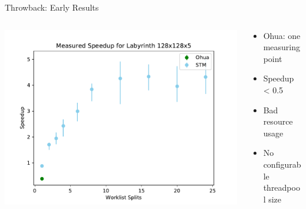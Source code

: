 \documentclass[aspectratio=169, usenames, dvipsnames]{beamer}
\begin{document}
\begin{frame}{Throwback: Early Results}
  \begin{columns}
    \begin{column}{0.55\textwidth}
      \centering
      \includegraphics[width=\textwidth,height=.7\textheight,keepaspectratio]{img/2019-04-18-128x128x5}
    \end{column}
    \begin{column}{0.45\textwidth}
      \begin{itemize}
        \item Ohua: one measuring point
        \item Speedup < 0.5
        \item<2-> Bad resource usage
        \item<2-> No configurable threadpool size
      \end{itemize}
    \end{column}
  \end{columns}
\end{frame}
\end{document}
